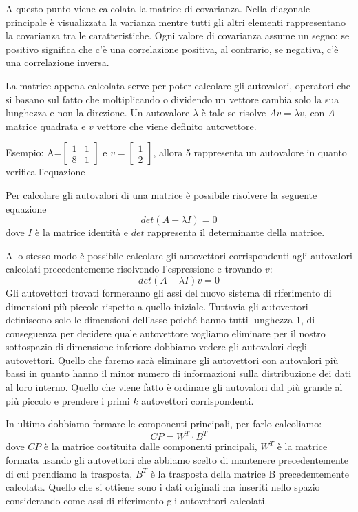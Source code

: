 \documentclass[12pt,italian]{report}
\begin{document}
A questo punto viene calcolata la matrice di covarianza. Nella diagonale principale è visualizzata la varianza mentre tutti gli altri elementi rappresentano la covarianza tra le caratteristiche. Ogni valore di covarianza assume un segno: se positivo significa che c'è una correlazione positiva, al contrario, se negativa, c'è una correlazione inversa.

La matrice appena calcolata serve per poter calcolare gli autovalori, operatori che si basano sul fatto che moltiplicando o dividendo un vettore cambia solo la sua lunghezza e non la direzione. Un autovalore $\lambda$ è tale se risolve $Av = \lambda v$, con $A$ matrice quadrata e $v$ vettore che viene definito autovettore. 

Esempio: A=$\left [\begin{matrix}
1&1\\8&1
\end{matrix}\right]
$ 
e
$v=\left[\begin{matrix}
1\\2
\end{matrix} \right]$, allora 5 rappresenta un autovalore in quanto verifica l'equazione

Per calcolare gli autovalori di una matrice è possibile risolvere la seguente equazione
\begin{equation}
det(A - \lambda I) = 0
\end{equation}
dove $I$ è la matrice identità e $det$ rappresenta il determinante della matrice.

Allo stesso modo è possibile calcolare gli autovettori corrispondenti agli autovalori calcolati precedentemente risolvendo l'espressione e trovando $v$:
\begin{equation}
det(A - \lambda I) v = 0
\end{equation}
Gli autovettori trovati formeranno gli assi del nuovo sistema di riferimento di dimensioni più piccole rispetto a quello iniziale. Tuttavia gli autovettori definiscono solo le dimensioni dell'asse poiché hanno tutti lunghezza 1, di conseguenza per decidere quale autovettore vogliamo eliminare per il nostro sottospazio di dimensione inferiore dobbiamo vedere gli autovalori degli autovettori. Quello che faremo sarà eliminare gli autovettori con autovalori più bassi in quanto hanno il minor numero di informazioni sulla distribuzione dei dati al loro interno. Quello che viene fatto è ordinare gli autovalori dal più grande al più piccolo e prendere i primi $k$ autovettori corrispondenti.

In ultimo dobbiamo formare le componenti principali, per farlo calcoliamo:
\begin{equation}
CP = W^{T} \cdot B^{T}
\end{equation}
dove $CP$ è la matrice costituita dalle componenti principali, $W^{T}$ è la matrice formata usando gli autovettori che abbiamo scelto di mantenere precedentemente di cui prendiamo la trasposta, $B^{T}$ è la trasposta della matrice B precedentemente calcolata.
Quello che si ottiene sono i dati originali ma inseriti nello spazio considerando come assi di riferimento gli autovettori calcolati.
\end{document}
